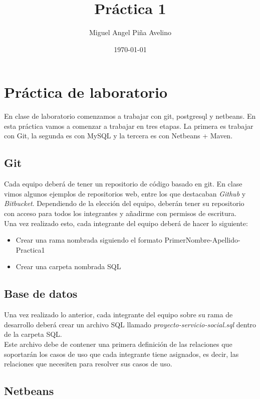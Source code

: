 \documentclass[11pt]{article}
\author{Miguel Angel Piña Avelino}
\date{\today}
\title{Práctica 1}
\begin{document}
\maketitle

\section*{Práctica de laboratorio}

En clase de laboratorio comenzamos a trabajar con git, postgresql y
netbeans. En esta práctica vamos a comenzar a trabajar en tres
etapas. La primera es trabajar con Git, la segunda es con MySQL y la
tercera es con Netbeans + Maven.

\subsection*{Git}
Cada equipo deberá de tener un repositorio de código basado en git. En
clase vimos algunos ejemplos de repositorios web, entre los que
destacaban \textit{Github} y \textit{Bitbucket}. Dependiendo de la
elección del equipo, deberán tener su repositorio con acceso  para
todos los integrantes y añadirme con permisos de escritura.\\

Una vez realizado esto, cada integrante del equipo deberá de hacer lo siguiente:
\begin{itemize}
  \item Crear una rama nombrada siguiendo el formato
    {PrimerNombre}-{Apellido}-{Practica1}
  \item Crear una carpeta nombrada SQL
\end{itemize}

\subsection*{Base de datos}

Una vez realizado lo anterior, cada integrante del equipo sobre su
rama de desarrollo deberá crear un archivo SQL llamado
\textit{proyecto-servicio-social.sql} dentro de la carpeta SQL.\\

Este archivo debe de contener una primera definición de las relaciones
que soportarán los casos de uso que cada integrante tiene asignados,
es decir, las relaciones que necesiten para resolver sus casos de
uso.\\

\subsection*{Netbeans}
\end{document}
